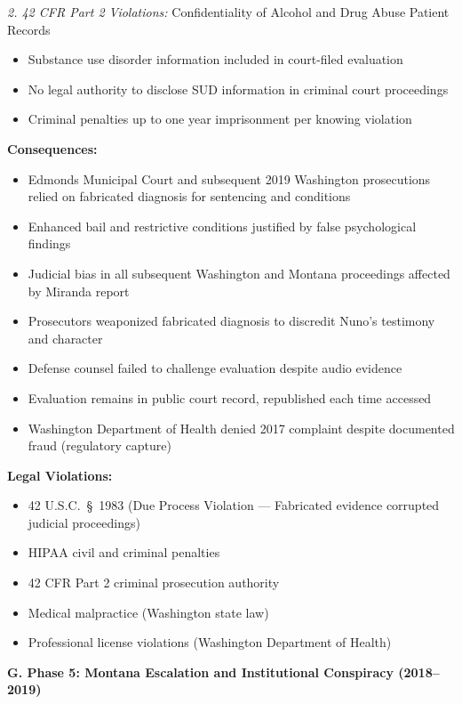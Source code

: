 \documentclass[11pt, letterpaper]{article}
\newcommand{\subsectiontitle}[1]{\vspace{0.15in}\noindent\textcolor{NavyBlue}{\textbf{#1}}\vspace{0.05in}}
\begin{document}
\textit{2. 42 CFR Part 2 Violations:} Confidentiality of Alcohol and Drug Abuse Patient Records
\begin{itemize}[leftmargin=*,itemsep=2pt]
    \item Substance use disorder information included in court-filed evaluation
    \item No legal authority to disclose SUD information in criminal court proceedings
    \item Criminal penalties up to one year imprisonment per knowing violation
\end{itemize}

\textbf{Consequences:}
\begin{itemize}[leftmargin=*,itemsep=2pt]
    \item Edmonds Municipal Court and subsequent 2019 Washington prosecutions relied on fabricated diagnosis for sentencing and conditions
    \item Enhanced bail and restrictive conditions justified by false psychological findings
    \item Judicial bias in all subsequent Washington and Montana proceedings affected by Miranda report
    \item Prosecutors weaponized fabricated diagnosis to discredit Nuno's testimony and character
    \item Defense counsel failed to challenge evaluation despite audio evidence
    \item Evaluation remains in public court record, republished each time accessed
    \item Washington Department of Health denied 2017 complaint despite documented fraud (regulatory capture)
\end{itemize}

\textbf{Legal Violations:}
\begin{itemize}[leftmargin=*,itemsep=2pt]
    \item 42 U.S.C.\ \S\ 1983 (Due Process Violation --- Fabricated evidence corrupted judicial proceedings)
    \item HIPAA civil and criminal penalties
    \item 42 CFR Part 2 criminal prosecution authority
    \item Medical malpractice (Washington state law)
    \item Professional license violations (Washington Department of Health)
\end{itemize}

\subsectiontitle{G. Phase 5: Montana Escalation and Institutional Conspiracy (2018--2019)}
\end{document}
